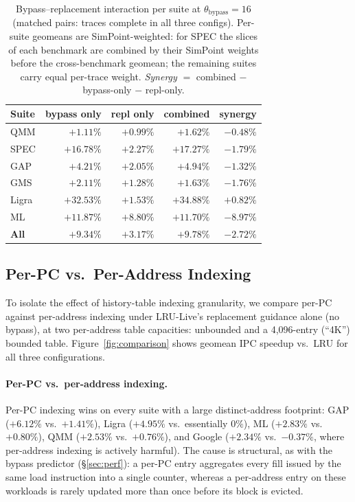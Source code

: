 \documentclass[conference]{IEEEtran}
\newcommand{\lru}{\textsc{LRU}\xspace}
\begin{document}
\setcounter{table}{3}
\begin{table}[t!]
\centering
\small
\caption{Bypass--replacement interaction per suite at $\theta_{\mathrm{bypass}}=16$
  (matched pairs: traces complete in all three configs).
  Per-suite geomeans are SimPoint-weighted: for SPEC the slices of each
  benchmark are combined by their SimPoint weights before the cross-benchmark
  geomean; the remaining suites carry equal per-trace weight.
  \emph{Synergy} $=$ combined $-$ bypass-only $-$ repl-only.}
\label{tab:bypass_synergy}
\begin{tabular}{lrrrr}
\toprule
\textbf{Suite} & bypass only & repl only & combined & synergy \\
\midrule
QMM   & $+1.11\%$  & $+0.99\%$  & $+1.62\%$  & $-0.48\%$ \\
SPEC  & $+16.78\%$ & $+2.27\%$  & $+17.27\%$ & $-1.79\%$ \\
GAP   & $+4.21\%$  & $+2.05\%$  & $+4.94\%$  & $-1.32\%$ \\
GMS   & $+2.11\%$  & $+1.28\%$  & $+1.63\%$  & $-1.76\%$ \\
Ligra & $+32.53\%$ & $+1.53\%$  & $+34.88\%$ & $\mathbf{+0.82\%}$ \\
ML    & $+11.87\%$ & $+8.80\%$  & $+11.70\%$ & $-8.97\%$ \\
\midrule
\textbf{All} & $+9.34\%$ & $+3.17\%$ & $+9.78\%$ & $-2.72\%$ \\
\bottomrule
\end{tabular}
\end{table}

\subsection{Per-PC vs.\ Per-Address Indexing}
\label{sec:indexing}

To isolate the effect of history-table indexing granularity, we compare
per-PC against per-address indexing under \lru-Live's replacement guidance
alone (no bypass), at two per-address table capacities: unbounded and a
4,096-entry (``4K'') bounded table. Figure~\ref{fig:comparison} shows geomean
IPC speedup vs.\ \lru for all three configurations.

\paragraph{Per-PC vs.\ per-address indexing.}
Per-PC indexing wins on every suite with a large distinct-address footprint:
GAP ($+6.12\%$ vs.\ $+1.41\%$), Ligra ($+4.95\%$ vs.\ essentially $0\%$), ML
($+2.83\%$ vs.\ $+0.80\%$), QMM ($+2.53\%$ vs.\ $+0.76\%$), and Google
($+2.34\%$ vs.\ $-0.37\%$, where per-address indexing is actively harmful).
The cause is structural, as with the bypass predictor (\S\ref{sec:perf}): a
per-PC entry aggregates every fill issued by the same load instruction into a
single counter, whereas a per-address entry on these workloads is rarely
updated more than once before its block is evicted.
\end{document}
